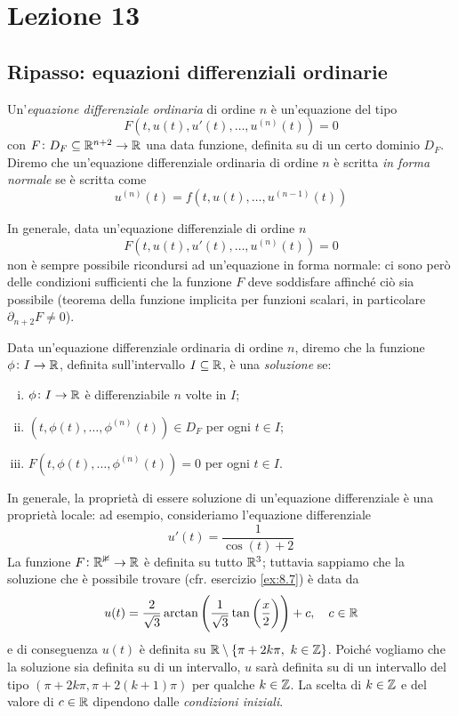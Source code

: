 \section{Lezione 13}
\subsection{Ripasso: equazioni differenziali ordinarie}
\begin{definition}
    \label{def:11.1}
    Un'\emph{equazione differenziale ordinaria} di ordine $n$ è un'equazione del tipo
    \[
    F(t, u(t), u'(t), \dots, u^{(n)}(t)) = 0
    \]
    con $F\colon D_F\subseteq \amsbb{R}^{n+2}\to \amsbb{R}$ una data funzione, definita su di un certo dominio $D_F$.\\
    Diremo che un'equazione differenziale ordinaria di ordine $n$ è scritta \emph{in forma normale} se è scritta come
    \[
    u^{(n)}(t) = f(t, u(t), \dots, u^{(n-1)}(t))
    \]
\end{definition}
\begin{remark}
    In generale, data un'equazione differenziale di ordine $n$
    \[
    F(t, u(t), u'(t), \dots, u^{(n)}(t))=0
    \]
    non è sempre possibile ricondursi ad un'equazione in forma normale: ci sono però delle condizioni sufficienti che la funzione $F$ deve soddisfare affinché ciò sia possibile (teorema della funzione implicita per funzioni scalari, in particolare $\partial_{n+2}F \ne 0$).
\end{remark}
\begin{definition}
    \label{def:11.2}
    Data un'equazione differenziale ordinaria di ordine $n$, diremo che la funzione $\phi\colon I \to \amsbb{R}$, definita sull'intervallo $I\subseteq \amsbb{R}$, è una \emph{soluzione} se:
    \begin{enumerate}[(i)]
        \item $\phi\colon I \to \amsbb{R}$ è differenziabile $n$ volte in $I$;
        \item $(t, \phi(t), \dots, \phi^{(n)}(t))\in D_F$ per ogni $t\in I$;
        \item $F(t, \phi(t), \dots, \phi^{(n)}(t))=0$ per ogni $t\in I$.
    \end{enumerate}
\end{definition}
\begin{remark}
    In generale, la proprietà di essere soluzione di un'equazione differenziale è una proprietà locale: ad esempio, consideriamo l'equazione differenziale
    \[
    u'(t) = \frac{1}{\cos(t)+2}
    \]
    La funzione $F\colon \amsbb{R^3}\to \amsbb{R}$ è definita su tutto $\amsbb{R}^3$; tuttavia sappiamo che la soluzione che è possibile trovare (cfr. esercizio \ref{ex:8.7}) è data da
    \[
    u(t) = \frac{2}{\sqrt{3}}\arctan\left(\frac{1}{\sqrt{3}}\tan\left(\frac{x}{2}\right)\right)+c, \quad c\in\amsbb{R}
    \]
    e di conseguenza $u(t)$ è definita su $\amsbb{R}\setminus\{\pi + 2k\pi, \ k\in\amsbb{Z}\}$. Poiché vogliamo che la soluzione sia definita su di un intervallo, $u$ sarà definita su di un intervallo del tipo $(\pi + 2k\pi, \pi + 2(k+1)\pi)$ per qualche $k\in\amsbb{Z}$. La scelta di $k\in\amsbb{Z}$ e del valore di $c\in\amsbb{R}$ dipendono dalle \emph{condizioni iniziali}.
\end{remark}
